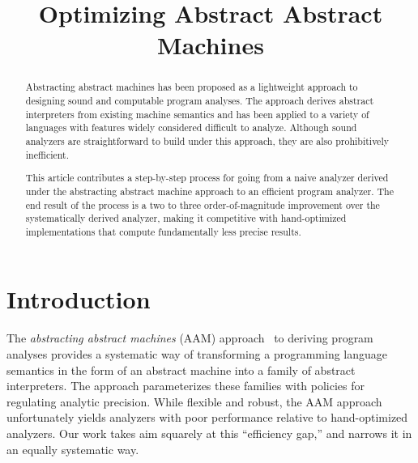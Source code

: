 \documentclass[preprint,onecolumn,9pt]{sigplanconf} %
\newcommand{\naive}{naive}
\begin{document}
\copyrightdata{[to be supplied]}


\title{Optimizing Abstract Abstract Machines}

\authorinfo{}{}{}

\maketitle

\begin{abstract}
Abstracting abstract machines has been proposed as a
lightweight approach to designing sound and computable program
analyses.  The approach derives abstract interpreters from
existing machine semantics and has been applied to a variety of
languages with features widely considered difficult to analyze.
Although sound analyzers are straightforward to build under this approach,
they are also prohibitively inefficient.

This article contributes a step-by-step process for going from a
\naive{} analyzer derived under the abstracting abstract machine
approach to an efficient program analyzer.  The end result of the
process is a two to three order-of-magnitude improvement over the
systematically derived analyzer, making it competitive with
hand-optimized implementations that compute fundamentally less precise
results.
\end{abstract}




\section{Introduction}

The \emph{abstracting abstract machines} (AAM)
approach~\cite{dvanhorn:VanHorn2011Abstracting,dvanhorn:VanHorn2012Systematic}
to deriving program analyses provides a systematic way of transforming a
programming language semantics in the form of an abstract machine into a family
of abstract interpreters.
%
The approach parameterizes these families with policies for regulating analytic
precision.
%
While flexible and robust, the AAM approach unfortunately yields analyzers with
poor performance relative to hand-optimized analyzers.
%
Our work takes aim squarely at this ``efficiency gap,'' and narrows it in an
equally systematic way.
\end{document}
